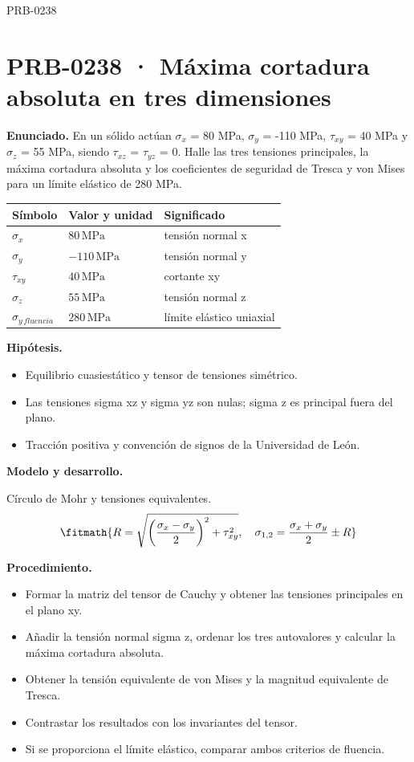 \begin{studiumworked}{PRB-0238}

\section{PRB-0238 · Máxima cortadura absoluta en tres dimensiones}

\textbf{Enunciado.} En un sólido actúan $\sigma_x$ = 80 MPa, $\sigma_y$ = -110 MPa, $\tau_{xy}$ = 40 MPa y $\sigma_z$ = 55 MPa, siendo $\tau_{xz}$ = $\tau_{yz}$ = 0. Halle las tres tensiones principales, la máxima cortadura absoluta y los coeficientes de seguridad de Tresca y von Mises para un límite elástico de 280 MPa.

\par\medskip\noindent\begin{tabular}{@{}p{.18\linewidth}p{.26\linewidth}p{.48\linewidth}@{}}
\toprule Símbolo & Valor y unidad & Significado\\\midrule
$\sigma_{x}$ & $80\,\mathrm{MPa}$ & tensión normal x\\
$\sigma_{y}$ & $-110\,\mathrm{MPa}$ & tensión normal y\\
$\tau_{xy}$ & $40\,\mathrm{MPa}$ & cortante xy\\
$\sigma_{z}$ & $55\,\mathrm{MPa}$ & tensión normal z\\
$\sigma_{y\,fluencia}$ & $280\,\mathrm{MPa}$ & límite elástico uniaxial\\
\bottomrule\end{tabular}\par\medskip

\textbf{Hipótesis.}\begin{itemize}\item Equilibrio cuasiestático y tensor de tensiones simétrico.
\item Las tensiones sigma xz y sigma yz son nulas; sigma z es principal fuera del plano.
\item Tracción positiva y convención de signos de la Universidad de León.\end{itemize}

\textbf{Modelo y desarrollo.}

Círculo de Mohr y tensiones equivalentes.\[\fitmath{R=\sqrt{\left(\frac{\sigma_x-\sigma_y}{2}\right)^2+\tau_{xy}^{2}},\quad\sigma_{1,2}=\frac{\sigma_x+\sigma_y}{2}\pm R}\]

\textbf{Procedimiento.}\begin{itemize}\item Formar la matriz del tensor de Cauchy y obtener las tensiones principales en el plano xy.
\item Añadir la tensión normal sigma z, ordenar los tres autovalores y calcular la máxima cortadura absoluta.
\item Obtener la tensión equivalente de von Mises y la magnitud equivalente de Tresca.
\item Contrastar los resultados con los invariantes del tensor.
\item Si se proporciona el límite elástico, comparar ambos criterios de fluencia.\end{itemize}


\end{studiumworked}
